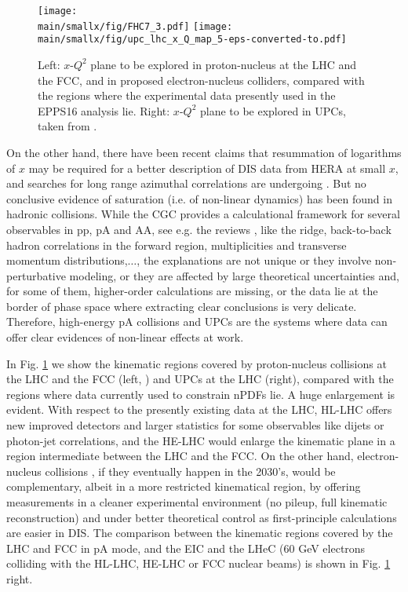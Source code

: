 \documentclass[../report.tex]{subfiles}
\providecommand{\main}{..}
\begin{document}
\begin{figure}[htb]
\centering
\texttt{[image: \\main/smallx/fig/FHC7\_3.pdf]} \hfill \texttt{[image: \\main/smallx/fig/upc\_lhc\_x\_Q\_map\_5-eps-converted-to.pdf]}
\caption{Left: $x$-$Q^2$ plane to be explored in proton-nucleus at the LHC and the FCC, and in  proposed electron-nucleus colliders, compared with the regions where the experimental data presently used in the EPPS16 analysis \cite{Eskola:2016oht} lie. Right: $x$-$Q^2$ plane to be explored in UPCs, taken from \cite{Baltz:2007kq}.}
\label{fig:smallx1}
\end{figure}

On the other hand, there have been recent claims \cite{Ball:2017otu,Abdolmaleki:2018jln} that resummation of logarithms of $x$ may be required for a better description of DIS data from HERA at small $x$, and searches for long range azimuthal correlations are undergoing \cite{zeusichep2018}. But no conclusive evidence of saturation (i.e. of non-linear dynamics) has been found in hadronic collisions. While the CGC provides a calculational framework for several observables in pp, pA and AA, see e.g. the reviews \cite{Albacete:2013tpa,Lappi:2015jka}, like the ridge, back-to-back hadron correlations in the forward region, multiplicities and transverse momentum distributions,$\dots$,  the explanations are not unique or they involve non-perturbative modeling, or they are affected by large theoretical uncertainties and, for some of them, higher-order calculations are missing, or the data lie at the border of phase space where extracting clear conclusions is very delicate. Therefore, high-energy pA collisions and UPCs are the systems where data can offer clear evidences of non-linear effects at work.

In Fig. \ref{fig:smallx1} we show the kinematic regions covered by proton-nucleus collisions at the LHC and the FCC (left, \cite{Dainese:2016gch}) and UPCs at the LHC (right), compared with the regions where data currently used to constrain nPDFs lie. A huge enlargement is evident. With respect to the presently existing data at the LHC, HL-LHC offers new improved detectors and larger statistics for some observables like dijets or photon-jet correlations, and the HE-LHC would enlarge the kinematic plane in a region intermediate between the LHC and the FCC. On the other hand, electron-nucleus collisions \cite{AbelleiraFernandez:2012cc,Accardi:2012qut}, if they eventually happen in the 2030's, would be complementary, albeit in a more restricted kinematical region, by offering measurements in a cleaner experimental environment (no pileup, full kinematic reconstruction) and under better theoretical control as first-principle calculations are easier in DIS. The comparison between the kinematic regions covered by the LHC and FCC in pA mode, and the EIC \cite{Accardi:2012qut} and the LHeC \cite{AbelleiraFernandez:2012cc} (60 GeV electrons colliding with the HL-LHC, HE-LHC or FCC nuclear beams) is shown in Fig. \ref{fig:smallx1} right.
\end{document}

